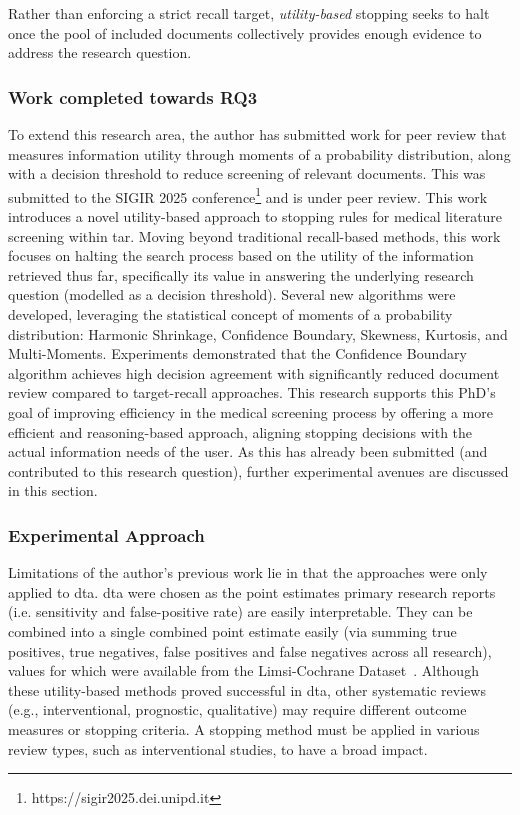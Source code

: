 \documentclass[10pt,oneside]{book}
\begin{document}
Rather than enforcing a strict recall target, \emph{utility-based} stopping seeks to halt once the pool of included documents collectively provides enough evidence to address the research question. 

\subsubsection{Work completed towards RQ3}

To extend this research area, the author has submitted work for peer review that measures information utility through moments of a probability distribution, along with a decision threshold to reduce screening of relevant documents. This was submitted to the SIGIR 2025 conference\footnote{https://sigir2025.dei.unipd.it} and is under peer review. This work introduces a novel utility-based approach to stopping rules for medical literature screening within \gls*{tar}. Moving beyond traditional recall-based methods, this work focuses on halting the search process based on the utility of the information retrieved thus far, specifically its value in answering the underlying research question (modelled as a decision threshold). Several new algorithms were developed, leveraging the statistical concept of moments of a probability distribution: Harmonic Shrinkage, Confidence Boundary, Skewness, Kurtosis, and Multi-Moments. Experiments demonstrated that the Confidence Boundary algorithm achieves high decision agreement with significantly reduced document review compared to target-recall approaches. This research supports this PhD's goal of improving efficiency in the medical screening process by offering a more efficient and reasoning-based approach, aligning stopping decisions with the actual information needs of the user. As this has already been submitted (and contributed to this research question), further experimental avenues are discussed in this section.   

\subsubsection{Experimental Approach}

Limitations of the author's previous work lie in that the approaches were only applied to \gls*{dta}. \gls*{dta} were chosen as the point estimates primary research reports (i.e. sensitivity and false-positive rate) are easily interpretable. They can be combined into a single combined point estimate easily (via summing true positives, true negatives, false positives and false negatives across all research), values for which were available from the  Limsi-Cochrane Dataset~\cite{norman_cochrane_2018}. Although these utility-based methods proved successful in \gls*{dta}, other systematic reviews (e.g., interventional, prognostic, qualitative) may require different outcome measures or stopping criteria. A stopping method must be applied in various review types, such as interventional studies, to have a broad impact. 
\end{document}
